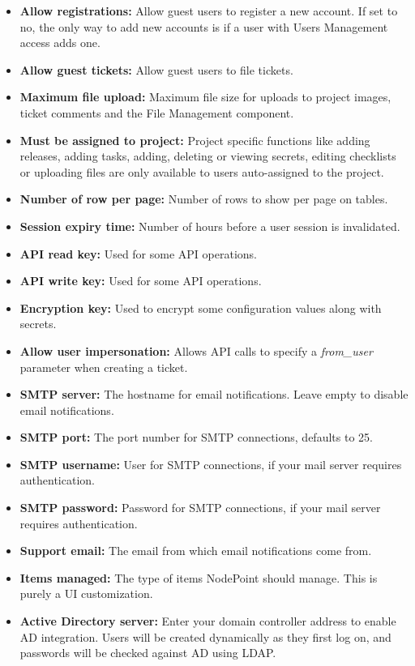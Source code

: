 \documentclass[11pt]{article}
\begin{document}
\begin{itemize}
\item \textbf{Allow registrations:} Allow guest users to register a new account. If set to no, the only way to add new accounts is if a user with Users Management access adds one.
\item \textbf{Allow guest tickets:} Allow guest users to file tickets.
\item \textbf{Maximum file upload:} Maximum file size for uploads to project images, ticket comments and the File Management component.
\item \textbf{Must be assigned to project:} Project specific functions like adding releases, adding tasks, adding, deleting or viewing secrets, editing checklists or uploading files are only available to users auto-assigned to the project.
\item \textbf{Number of row per page:} Number of rows to show per page on tables.
\item \textbf{Session expiry time:} Number of hours before a user session is invalidated.
\item \textbf{API read key:} Used for some API operations.
\item \textbf{API write key:} Used for some API operations.
\item \textbf{Encryption key:} Used to encrypt some configuration values along with secrets.
\item \textbf{Allow user impersonation:} Allows API calls to specify a \textit{from\_user} parameter when creating a ticket.
\item \textbf{SMTP server:} The hostname for email notifications. Leave empty to disable email notifications.
\item \textbf{SMTP port:} The port number for SMTP connections, defaults to 25.
\item \textbf{SMTP username:} User for SMTP connections, if your mail server requires authentication.
\item \textbf{SMTP password:} Password for SMTP connections, if your mail server requires authentication.
\item \textbf{Support email:} The email from which email notifications come from.
\item \textbf{Items managed:} The type of items NodePoint should manage. This is purely a UI customization.
\item \textbf{Active Directory server:} Enter your domain controller address to enable AD integration. Users will be created dynamically as they first log on, and passwords will be checked against AD using LDAP.

\end{itemize}
\end{document}
